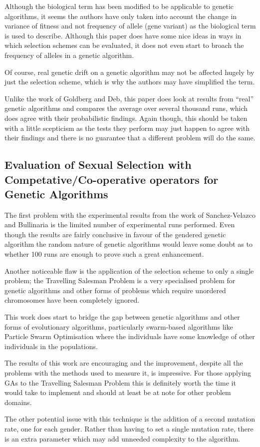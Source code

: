 \documentclass[10pt, a4paper]{article}
\begin{document}
Although the biological term has been modified to be applicable to genetic
algorithms, it seems the authors have only taken into account the change in
variance of fitness and not frequency of allele (gene variant) as the 
biological term is used to describe. Although this paper does have some nice
ideas in ways in which selection schemes can be evaluated, it does not even
start to broach the frequency of alleles in a genetic algorithm.

Of course, real genetic drift on a genetic algorithm may not be affected hugely
by just the selection scheme, which is why the authors may have simplified the
term.

Unlike the work of Goldberg and Deb, this paper does look at results from
``real'' genetic algorithms and compares the average over several thousand 
runs, which does agree with their probabilistic findings. Again though, this
should be taken with a little scepticism as the tests they perform may just
happen to agree with their findings and there is no guarantee that a different
problem will do the same.


\subsection{Evaluation of Sexual Selection with Competative/Co-operative operators for Genetic Algorithms}
The first problem with the experimental results from the work of 
Sanchez-Velazco and Bullinaria\cite{SanchezVelazco2003Sexual} is the limited
number of experimental runs performed. Even though the results are fairly
conclusive in favour of the gendered genetic algorithm the random nature of
genetic algorithms would leave some doubt as to whether 100 runs are enough to
prove such a great enhancement.

Another noticeable flaw is the application of the selection scheme to only a
single problem; the Travelling Salesman Problem is a very specialised problem
for genetic algorithms and other forms of problems which require unordered
chromosomes have been completely ignored.

This work does start to bridge the gap between genetic algorithms and other
forms of evolutionary algorithms, particularly swarm-based algorithms like
Particle Swarm Optimisation where the individuals have some knowledge of other
individuals in the populations.

The results of this work are encouraging and the improvement, despite all the
problems with the methods used to measure it, is impressive. For those applying
GAs to the Travelling Salesman Problem this is definitely worth the time it
would take to implement and should at least be at note for other problem
domains.

The other potential issue with this technique is the addition of a second
mutation rate, one for each gender. Rather than having to set a single mutation
rate, there is an extra parameter which may add unneeded complexity to the
algorithm.

\newpage


\end{document}
